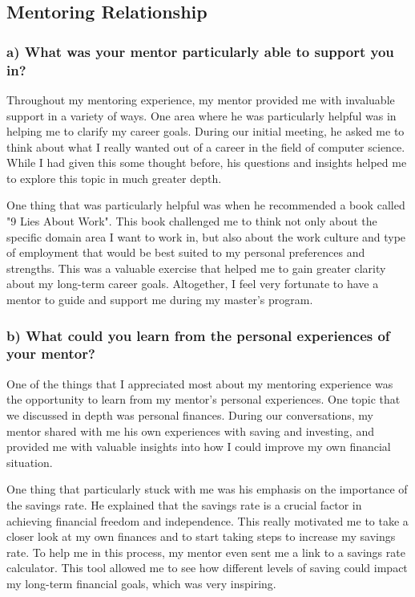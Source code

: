 \documentclass{core/report-template}
\begin{document}
\subsection{Mentoring Relationship}
\subsubsection{a) What was your mentor particularly able to support you in?}

Throughout my mentoring experience, my mentor provided me with invaluable support in a variety of ways. One area where he was particularly helpful was in helping me to clarify my career goals. During our initial meeting, he asked me to think about what I really wanted out of a career in the field of computer science. While I had given this some thought before, his questions and insights helped me to explore this topic in much greater depth.

One thing that was particularly helpful was when he recommended a book called "9 Lies About Work". This book challenged me to think not only about the specific domain area I want to work in, but also about the work culture and type of employment that would be best suited to my personal preferences and strengths. This was a valuable exercise that helped me to gain greater clarity about my long-term career goals. Altogether, I feel very fortunate to have a mentor to guide and support me during my master's program.

\subsubsection{b) What could you learn from the personal experiences of your mentor?}
One of the things that I appreciated most about my mentoring experience was the opportunity to learn from my mentor's personal experiences. One topic that we discussed in depth was personal finances. During our conversations, my mentor shared with me his own experiences with saving and investing, and provided me with valuable insights into how I could improve my own financial situation.

One thing that particularly stuck with me was his emphasis on the importance of the savings rate. He explained that the savings rate is a crucial factor in achieving financial freedom and independence. This really motivated me to take a closer look at my own finances and to start taking steps to increase my savings rate. To help me in this process, my mentor even sent me a link to a savings rate calculator. This tool allowed me to see how different levels of saving could impact my long-term financial goals, which was very inspiring. 
\end{document}
